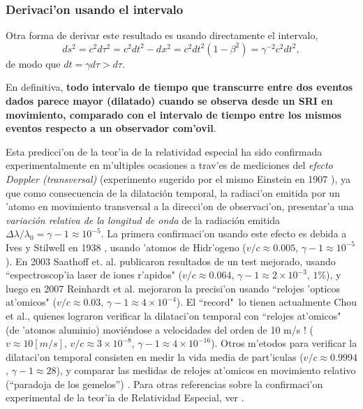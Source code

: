 \subsubsection{Derivaci'on usando el intervalo}

Otra forma de derivar este resultado es usando directamente el intervalo,
\begin{equation}
 ds^2=c^2d\tau^2=c^2dt^2-dx^2=c^2dt^2(1-\beta^2)=\gamma^{-2}c^2dt^2,
\end{equation}
de modo que $dt=\gamma d\tau>d\tau$.


En definitiva, \textbf{todo intervalo de tiempo que transcurre entre dos eventos dados parece mayor (dilatado) cuando se observa desde un SRI en movimiento, comparado con el intervalo de tiempo entre los mismos eventos respecto a un observador com'ovil}.

Esta predicci'on de la teor'ia de la relatividad especial ha sido confirmada experimentalmente en m'ultiples ocasiones a trav'es de mediciones del \textit{efecto Doppler (transversal)} (experimento sugerido por el mismo Einstein en 1907 \cite{Einstein07}), ya que como consecuencia de la dilatación temporal, la radiaci'on emitida por un 'atomo en movimiento transversal a la direcci'on de observaci'on, presentar'a una \textit{variación relativa de la longitud de onda} de la radiación emitida $\Delta\lambda/\lambda_0=\gamma-1\approx 10^{-5}$. La primera confirmaci'on usando este efecto es debida a Ives y Stilwell en 1938 \cite{IS38}, usando 'atomos de Hidr'ogeno  ($v/c\approx 0.005$, $\gamma-1\approx 10^{-5}$). En 2003 Saathoff et. al. publicaron resultados de un test mejorado, usando ``espectroscop'ia laser de iones r'apidos" \cite{Saathoff03} ($v/c\approx 0.064$, $\gamma-1\approx 2\times 10^{-3}$, $1\%$), y luego en 2007 Reinhardt et al. mejoraron la precisi'on usando ``relojes 'opticos at'omicos" \cite{Reinhardt07} ($v/c\approx 0.03$, $\gamma-1\approx 4\times 10^{-4}$). El ``record"\, lo tienen actualmente Chou et al., quienes lograron verificar la dilataci'on temporal con ``relojes at'omicos" (de 'atomos aluminio) moviéndose a velocidades del orden de 10 m/s ! \cite{Chou10} ($v\approx 10 [m/s]$, $v/c\approx 3\times 10^{-8}$, $\gamma-1\approx 4\times 10^{-16}$). Otros m'etodos para verificar la dilataci'on temporal consisten en medir la vida media de part'iculas \cite{Bailey77} ($v/c\approx 0.9994$, $\gamma-1\approx 28$), y comparar las medidas de relojes at'omicos en movimiento relativo (``paradoja de los gemelos'') \cite{HK72a,HK72b}. Para otras referencias sobre la confirmaci'on experimental de la teor'ia de Relatividad Especial, ver \cite{SRexp}.

